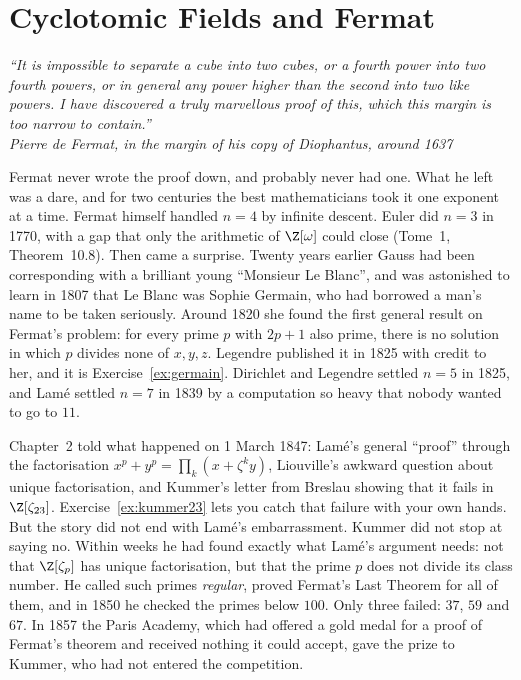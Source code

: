 \chapter{Cyclotomic Fields and Fermat}
\begin{center}\itshape
``It is impossible to separate a cube into two cubes, or a fourth power into two fourth powers, or in general any power
higher than the second into two like powers. I have discovered a truly marvellous proof of this, which this margin is
too narrow to contain.''\\[0.3em]
\upshape Pierre de Fermat, in the margin of his copy of Diophantus, around 1637
\end{center}

Fermat never wrote the proof down, and probably never had one. What he left was a dare, and for two centuries the best
mathematicians took it one exponent at a time. Fermat himself handled $n=4$ by infinite descent. Euler did $n=3$ in 1770,
with a gap that only the arithmetic of $\Z[\omega]$ could close (Tome~1, Theorem~10.8). Then came a surprise. Twenty years
earlier Gauss had been corresponding with a brilliant young ``Monsieur Le Blanc'', and was astonished to learn in 1807 that
Le Blanc was Sophie Germain, who had borrowed a man's name to be taken seriously. Around 1820 she found the first general
result on Fermat's problem: for every prime $p$ with $2p+1$ also prime, there is no solution in which $p$ divides none of
$x,y,z$. Legendre published it in 1825 with credit to her, and it is Exercise~\ref{ex:germain}. Dirichlet and
Legendre settled $n=5$ in 1825, and Lamé settled $n=7$ in 1839 by a computation so heavy that nobody wanted to go to $11$.

Chapter~2 told what happened on 1 March 1847: Lamé's general ``proof'' through the factorisation $x^p+y^p=\prod_k
(x+\zeta^ky)$, Liouville's awkward question about unique factorisation, and Kummer's letter from Breslau showing that it
fails in $\Z[\zeta_{23}]$. Exercise~\ref{ex:kummer23} lets you catch that failure with your own hands. But the story did not
end with Lamé's embarrassment. Kummer did not stop at saying no. Within weeks he had found exactly what Lamé's argument
needs: not that $\Z[\zeta_p]$ has unique factorisation, but that the prime $p$ does not divide its class number. He called
such primes \emph{regular}, proved Fermat's Last Theorem for all of them, and in 1850 he checked the primes below $100$.
Only three failed: $37$, $59$ and $67$. In 1857 the Paris Academy, which had offered a gold medal for a proof of
Fermat's theorem and received nothing it could accept, gave the prize to Kummer, who had not entered the competition.


